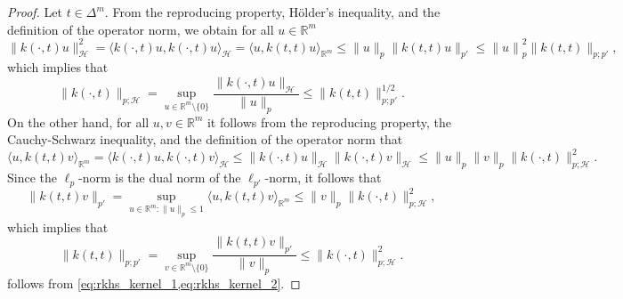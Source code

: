 \documentclass{article}
\begin{document}
\begin{proof}
  Let $t \in \Delta^m$. From the reproducing property, Hölder's inequality, and
  the definition of the operator norm, we obtain for all $u \in \mathbb{R}^m$
  \begin{equation*}
    \|k(\cdot, t)u\|_{\mathcal{H}}^2 = \langle k(\cdot, t) u, k(\cdot, t) u\rangle_{\mathcal{H}} = \langle u, k(t, t) u \rangle_{\mathbb{R}^m} \leq \|u\|_p \|k(t, t) u\|_{p'} \leq {\|u\|}^2_p \|k(t,t)\|_{p;p'},
  \end{equation*}
  which implies that
  \begin{equation}\label{eq:rkhs_kernel_1}
    \|k(\cdot, t)\|_{p;\mathcal{H}} = \sup_{u \in \mathbb{R}^m \setminus \{0\}} \frac{\|k(\cdot, t)u\|_{\mathcal{H}}}{\|u\|_p} \leq \|k(t,t)\|_{p;p'}^{1/2}.
  \end{equation}
  On the other hand, for all $u,v \in \mathbb{R}^m$ it follows from the
  reproducing property, the Cauchy-Schwarz inequality, and the definition of the
  operator norm that
  \begin{equation*}
    \langle u, k(t,t) v \rangle_{\mathbb{R}^m} = \langle k(\cdot, t) u, k(\cdot, t) v \rangle_{\mathcal{H}} \leq \|k(\cdot, t) u\|_{\mathcal{H}} \|k(\cdot, t) v\|_{\mathcal{H}} \leq \|u\|_p \|v\|_p \|k(\cdot, t)\|^2_{p;\mathcal{H}}.
  \end{equation*}
  Since the $\ell_p$-norm is the dual norm of the $\ell_{p'}$-norm, it follows
  that
  \begin{equation*}
    \|k(t,t)v\|_{p'} = \sup_{u \in \mathbb{R}^m \colon \|u\|_p \leq 1} \langle u, k(t,t)v\rangle_{\mathbb{R}^m} \leq \|v\|_p \|k(\cdot, t)\|^2_{p;\mathcal{H}},
  \end{equation*}
  which implies that
  \begin{equation}\label{eq:rkhs_kernel_2}
    \|k(t,t)\|_{p;p'} = \sup_{v \in \mathbb{R}^m \setminus \{0\}} \frac{\|k(t,t)v\|_{p'}}{\|v\|_p} \leq \|k(\cdot, t)\|^2_{p;\mathcal{H}}.
  \end{equation}
   follows from \cref{eq:rkhs_kernel_1,eq:rkhs_kernel_2}.


\end{proof}
\end{document}
